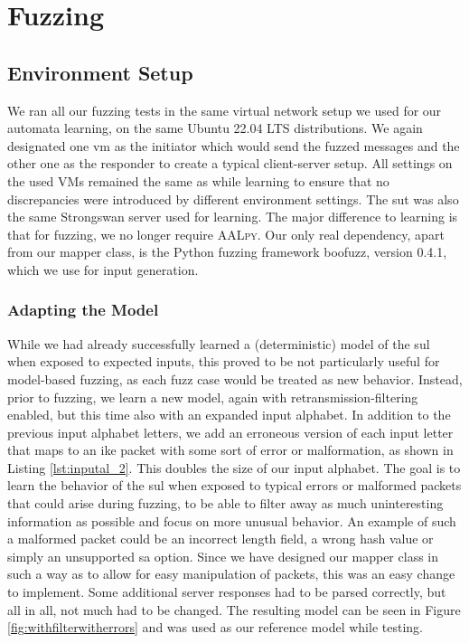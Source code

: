 %
%
% 
% 
% 

\chapter{Fuzzing}

\label{chap:Fuzzing}

\section{Environment Setup} \label{sec:fuzzenv}
We ran all our fuzzing tests in the same virtual network setup we used for our automata learning, on the same Ubuntu 22.04 LTS distributions. We again designated one \ac{vm} as the initiator which would send the fuzzed messages and the other one as the responder to create a typical client-server setup. All settings on the used VMs remained the same as while learning to ensure that no discrepancies were introduced by different environment settings. The \ac{sut} was also the same Strongswan server used for learning. The major difference to learning is that for fuzzing, we no longer require \textsc{AALpy}. Our only real dependency, apart from our mapper class, is the Python fuzzing framework boofuzz, version 0.4.1, which we use for input generation. 

\subsection{Adapting the Model} \label{subsec:adapting_model}
While we had already successfully learned a (deterministic) model of the \ac{sul} when exposed to expected inputs, this proved to be not particularly useful for model-based fuzzing, as each fuzz case would be treated as new behavior. Instead, prior to fuzzing, we learn a new model, again with retransmission-filtering enabled, but this time also with an expanded input alphabet. In addition to the previous input alphabet letters, we add an erroneous version of each input letter that maps to an \ac{ike} packet with some sort of error or malformation, as shown in Listing \ref{lst:inputal_2}. This doubles the size of our input alphabet. The goal is to learn the behavior of the \ac{sul} when exposed to typical errors or malformed packets that could arise during fuzzing, to be able to filter away as much uninteresting information as possible and focus on more unusual behavior. An example of such a malformed packet could be an incorrect length field, a wrong hash value or simply an unsupported \ac{sa} option. Since we have designed our mapper class in such a way as to allow for easy manipulation of packets, this was an easy change to implement. Some additional server responses had to be parsed correctly, but all in all, not much had to be changed. The resulting model can be seen in Figure \ref{fig:withfilterwitherrors} and was used as our reference model while testing.  

